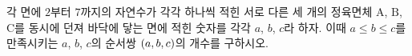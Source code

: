 각 면에 $2$부터 $7$까지의 자연수가 각각 하나씩 적힌 서로 다른 세 개의 정육면체 $\mathrm{A}$, $\mathrm{B}$, $\mathrm{C}$를 동시에 던져 바닥에 닿는 면에 적힌 숫자를 각각 $a$, $b$, $c$라 하자. 이때 $a\le b\le c$를 만족시키는 $a$, $b$, $c$의 순서쌍 $(a{,}\mkern3mu\mathopen{}b{,}\mkern3mu\mathopen{}c)$의 개수를 구하시오.

